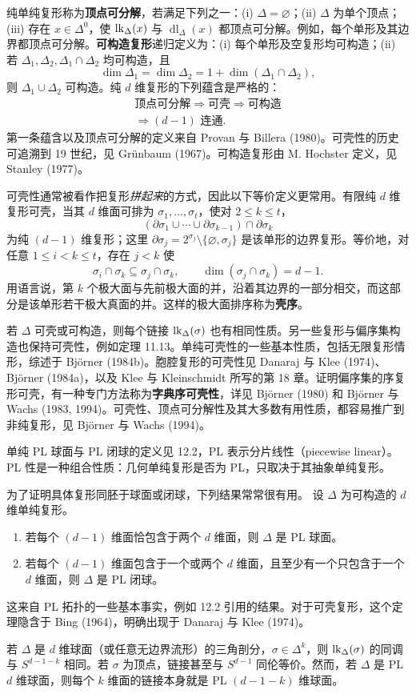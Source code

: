 纯单纯复形称为\textbf{顶点可分解}，若满足下列之一：(i) $\Delta=\varnothing$；(ii) $\Delta$ 为单个顶点；(iii) 存在 $x\in\Delta^0$，使 $\operatorname{lk}_\Delta(x)$ 与 $\operatorname{dl}_\Delta(x)$ 都顶点可分解。例如，每个单形及其边界都顶点可分解。\textbf{可构造复形}递归定义为：(i) 每个单形及空复形均可构造；(ii) 若 $\Delta_1,\Delta_2,\Delta_1\cap\Delta_2$ 均可构造，且
\[
\dim\Delta_1=\dim\Delta_2=1+\dim(\Delta_1\cap\Delta_2),
\]
则 $\Delta_1\cup\Delta_2$ 可构造。纯 $d$ 维复形的下列蕴含是严格的：
\[
\begin{gathered}
\text{顶点可分解}\Longrightarrow\text{可壳}\Longrightarrow\text{可构造}\\
\Longrightarrow(d-1)\text{ 连通}.
\end{gathered}
\]
第一条蕴含以及顶点可分解的定义来自 Provan 与 Billera (1980)。可壳性的历史可追溯到 19 世纪，见 Grünbaum (1967)。可构造复形由 M. Hochster 定义，见 Stanley (1977)。

可壳性通常被看作把复形\emph{拼起来}的方式，因此以下等价定义更常用。有限纯 $d$ 维复形可壳，当其 $d$ 维面可排为 $\sigma_1,\ldots,\sigma_t$，使对 $2\le k\le t$，
\[
(\partial\sigma_1\cup\cdots\cup\partial\sigma_{k-1})\cap\partial\sigma_k
\]
为纯 $(d-1)$ 维复形；这里 $\partial\sigma_j=2^{\sigma_j}\setminus\{\varnothing,\sigma_j\}$ 是该单形的边界复形。等价地，对任意 $1\le i<k\le t$，存在 $j<k$ 使
\[
\sigma_i\cap\sigma_k\subseteq\sigma_j\cap\sigma_k,\qquad
\dim(\sigma_j\cap\sigma_k)=d-1.
\]
用语言说，第 $k$ 个极大面与先前极大面的并，沿着其边界的一部分相交，而这部分是该单形若干极大真面的并。这样的极大面排序称为\textbf{壳序}。

若 $\Delta$ 可壳或可构造，则每个链接 $\operatorname{lk}_\Delta(\sigma)$ 也有相同性质。另一些复形与偏序集构造也保持可壳性，例如定理 11.13。单纯可壳性的一些基本性质，包括无限复形情形，综述于 Björner (1984b)。胞腔复形的可壳性见 Danaraj 与 Klee (1974)、Björner (1984a)，以及 Klee 与 Kleinschmidt 所写的第 18 章。证明偏序集的序复形可壳，有一种专门方法称为\textbf{字典序可壳性}，详见 Björner (1980) 和 Björner 与 Wachs (1983, 1994)。可壳性、顶点可分解性及其大多数有用性质，都容易推广到非纯复形，见 Björner 与 Wachs (1994)。

单纯 PL 球面与 PL 闭球的定义见 12.2，PL 表示分片线性（piecewise linear）。PL 性是一种组合性质：几何单纯复形是否为 PL，只取决于其抽象单纯复形。

为了证明具体复形同胚于球面或闭球，下列结果常常很有用。
设 $\Delta$ 为可构造的 $d$ 维单纯复形。
\begin{enumerate}[label=(\roman*)]
\item 若每个 $(d-1)$ 维面恰包含于两个 $d$ 维面，则 $\Delta$ 是 PL 球面。
\item 若每个 $(d-1)$ 维面包含于一个或两个 $d$ 维面，且至少有一个只包含于一个 $d$ 维面，则 $\Delta$ 是 PL 闭球。
\end{enumerate}
这来自 PL 拓扑的一些基本事实，例如 12.2 引用的结果。对于可壳复形，这个定理隐含于 Bing (1964)，明确出现于 Danaraj 与 Klee (1974)。

若 $\Delta$ 是 $d$ 维球面（或任意无边界流形）的三角剖分，$\sigma\in\Delta^k$，则 $\operatorname{lk}_\Delta(\sigma)$ 的同调与 $S^{d-1-k}$ 相同。若 $\sigma$ 为顶点，链接甚至与 $S^{d-1}$ 同伦等价。然而，若 $\Delta$ 是 PL $d$ 维球面，则每个 $k$ 维面的链接本身就是 PL $(d-1-k)$ 维球面。


